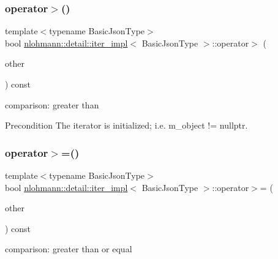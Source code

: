 \subsubsection{\texorpdfstring{operator$>$()}{operator>()}}
{\footnotesize\ttfamily template$<$typename Basic\+Json\+Type$>$ \\
bool \mbox{\hyperlink{classnlohmann_1_1detail_1_1iter__impl}{nlohmann\+::detail\+::iter\+\_\+impl}}$<$ Basic\+Json\+Type $>$\+::operator$>$ (\begin{DoxyParamCaption}\item[{const \mbox{\hyperlink{classnlohmann_1_1detail_1_1iter__impl}{iter\+\_\+impl}}$<$ Basic\+Json\+Type $>$ \&}]{other }\end{DoxyParamCaption}) const\hspace{0.3cm}{\ttfamily [inline]}}



comparison\+: greater than 

\begin{DoxyPrecond}{Precondition}
The iterator is initialized; i.\+e. {\ttfamily m\+\_\+object != nullptr}. 
\end{DoxyPrecond}
\mbox{\label{classnlohmann_1_1detail_1_1iter__impl_a634f85da575cb60b012a687efa26e11a}} 
\subsubsection{\texorpdfstring{operator$>$=()}{operator>=()}}
{\footnotesize\ttfamily template$<$typename Basic\+Json\+Type$>$ \\
bool \mbox{\hyperlink{classnlohmann_1_1detail_1_1iter__impl}{nlohmann\+::detail\+::iter\+\_\+impl}}$<$ Basic\+Json\+Type $>$\+::operator$>$= (\begin{DoxyParamCaption}\item[{const \mbox{\hyperlink{classnlohmann_1_1detail_1_1iter__impl}{iter\+\_\+impl}}$<$ Basic\+Json\+Type $>$ \&}]{other }\end{DoxyParamCaption}) const\hspace{0.3cm}{\ttfamily [inline]}}



comparison\+: greater than or equal 

